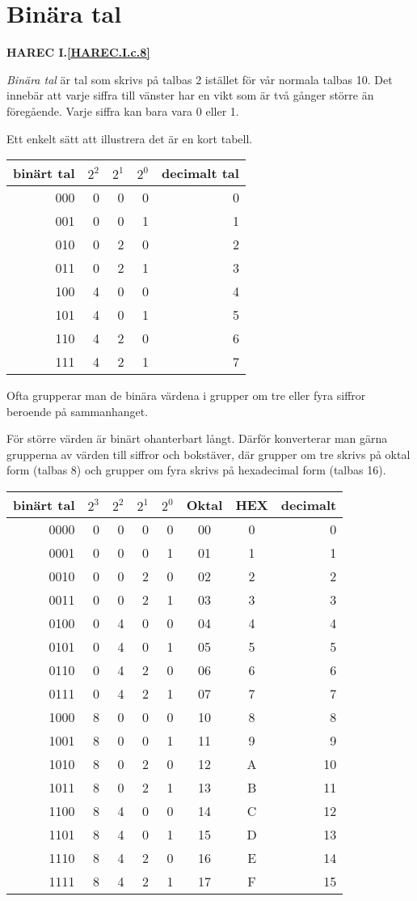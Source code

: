 \section{Binära tal}
\textbf{HAREC I.\ref{HAREC.I.c.8}\label{myHAREC.I.c.8}}

\emph{Binära tal} är tal som skrivs på talbas 2 istället för vår normala
talbas 10.
Det innebär att varje siffra till vänster har en vikt som är två gånger större
än föregående.
Varje siffra kan bara vara 0 eller 1.

Ett enkelt sätt att illustrera det är en kort tabell.

\begin{tabular}{r|rrr|r}
  binärt tal & \(2^2\) & \(2^1\) & \(2^0\) & decimalt tal \\ \hline
  000 & 0 & 0 & 0 & 0 \\
  001 & 0 & 0 & 1 & 1 \\
  010 & 0 & 2 & 0 & 2 \\
  011 & 0 & 2 & 1 & 3 \\
  100 & 4 & 0 & 0 & 4 \\
  101 & 4 & 0 & 1 & 5 \\
  110 & 4 & 2 & 0 & 6 \\
  111 & 4 & 2 & 1 & 7 \\
\end{tabular}

Ofta grupperar man de binära värdena i grupper om tre eller fyra siffror
beroende på sammanhanget.

För större värden är binärt ohanterbart långt.
Därför konverterar man gärna grupperna av värden till siffror och bokstäver,
där grupper om tre skrivs på oktal form (talbas 8) och grupper om fyra skrivs på 
hexadecimal form (talbas 16).

\begin{tabular}{r|rrrr|c|c|r}
  binärt tal & \(2^3\) & \(2^2\) & \(2^1\) & \(2^0\) & Oktal & HEX & decimalt\\ \hline
  0000 & 0 & 0 & 0 & 0 & 00 & 0 & 0 \\
  0001 & 0 & 0 & 0 & 1 & 01 & 1 & 1 \\
  0010 & 0 & 0 & 2 & 0 & 02 & 2 & 2 \\
  0011 & 0 & 0 & 2 & 1 & 03 & 3 & 3 \\
  0100 & 0 & 4 & 0 & 0 & 04 & 4 & 4 \\
  0101 & 0 & 4 & 0 & 1 & 05 & 5 & 5 \\
  0110 & 0 & 4 & 2 & 0 & 06 & 6 & 6 \\
  0111 & 0 & 4 & 2 & 1 & 07 & 7 & 7 \\
  1000 & 8 & 0 & 0 & 0 & 10 & 8 & 8 \\
  1001 & 8 & 0 & 0 & 1 & 11 & 9 & 9 \\
  1010 & 8 & 0 & 2 & 0 & 12 & A & 10 \\
  1011 & 8 & 0 & 2 & 1 & 13 & B & 11 \\
  1100 & 8 & 4 & 0 & 0 & 14 & C & 12 \\
  1101 & 8 & 4 & 0 & 1 & 15 & D & 13 \\
  1110 & 8 & 4 & 2 & 0 & 16 & E & 14 \\
  1111 & 8 & 4 & 2 & 1 & 17 & F & 15 \\
\end{tabular}
